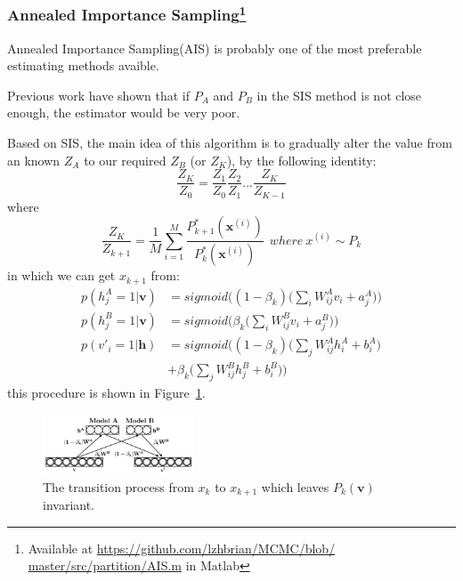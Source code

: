 
\subsubsection{Annealed Importance Sampling\protect\footnote{Available at \protect\url{https://github.com/lzhbrian/MCMC/blob/ master/src/partition/AIS.m} in Matlab}}

Annealed Importance Sampling(AIS)\cite{neal2001annealed,salakhutdinov2009learning} is probably one of the most preferable estimating methods avaible.

Previous work \cite{mackay2003information} have shown that if $P_{A}$ and $P_{B}$ in the SIS method is not close enough, the estimator would be very poor.

Based on SIS, the main idea of this algorithm is to gradually alter the value from an known $Z_{A}$ to our required $Z_{B}$ (or $Z_{K}$), by the following identity:
\begin{equation}
\frac{Z_{K}}{Z_{0}} = \frac{Z_{1}}{Z_{0}} \frac{Z_{2}}{Z_{1}} ... \frac{Z_{K}}{Z_{K-1}}
\end{equation}
where 
\begin{equation}
\frac{Z_{K}}{Z_{k+1}} = \frac{1}{M} \sum_{i=1}^{M} \frac{P_{k+1}^{*}(\mathbf x^{(i)})}{P_{k}^{*}(\mathbf x^{(i)})}
~~where~ x^{(i)} \sim P_{k}
\end{equation}
in which we can get $x_{k+1}$ from:
\begin{equation}
\begin{aligned}
p(h^{A}_{j}=1|\mathbf v) &= sigmoid\Bigg( (1-\beta_{k})\Bigg(\sum_{i}W^{A}_{ij}v_{i}+a^{A}_{j}\Bigg) \Bigg) \\
p(h^{B}_{j}=1|\mathbf v) &= sigmoid\Bigg( \beta_{k}\Bigg(\sum_{i}W^{B}_{ij}v_{i}+a^{B}_{j}\Bigg) \Bigg) \\ 
p(v'_{i}=1|\mathbf h) &= sigmoid\Bigg( (1-\beta_{k})\Bigg(\sum_{j}W^{A}_{ij}h_{i}^{A}+b^{A}_{i}\Bigg) \\
& + \beta_{k}\Bigg(\sum_{j}W^{B}_{ij}h_{j}^{B}+b^{B}_{i}\Bigg) \Bigg) 
\end{aligned}
\end{equation}
this procedure is shown in Figure~\ref{fig:xkxk1}.

\begin{figure}[tb]
  	\centering
  	\includegraphics[width=0.4\textwidth]{figure/xkxk1.png}
	\caption{The transition process from $x_{k}$ to $x_{k+1}$ which leaves $P_{k}(\mathbf v)$ invariant.}
	\label{fig:xkxk1}
\end{figure}

